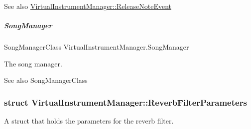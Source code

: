 \begin{DoxySeeAlso}{See also}
\hyperlink{group___virtual_instrument_manager_class_virtual_instrument_manager_1_1_release_note_event}{Virtual\+Instrument\+Manager\+::\+Release\+Note\+Event} 
\end{DoxySeeAlso}
\mbox{\label{group___virtual_instrument_manager_a33dae94932c10c66db76a0eebec76b01}} 
\subparagraph{\texorpdfstring{Song\+Manager}{SongManager}}
{\footnotesize\ttfamily Song\+Manager\+Class Virtual\+Instrument\+Manager.\+Song\+Manager}



The song manager. 

\begin{DoxySeeAlso}{See also}
Song\+Manager\+Class 
\end{DoxySeeAlso}
\label{struct_virtual_instrument_manager_1_1_reverb_filter_parameters}
\subsubsection{struct Virtual\+Instrument\+Manager\+:\+:Reverb\+Filter\+Parameters}
A struct that holds the parameters for the reverb filter. 

